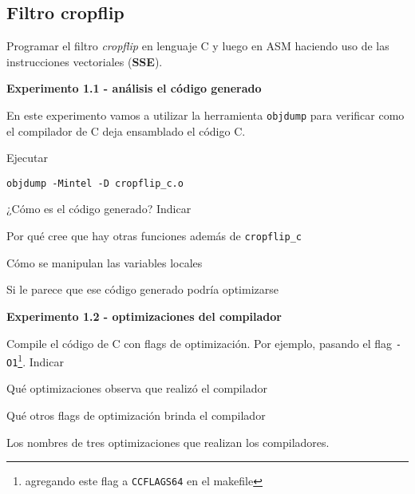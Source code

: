 \subsection{Filtro cropflip}

Programar el filtro \textit{cropflip} en lenguaje C y luego en ASM haciendo 
uso de las instrucciones vectoriales (\textbf{SSE}).

\vspace*{0.3cm} \noindent
\textbf{Experimento 1.1 - análisis el código generado}

En este experimento vamos a utilizar la herramienta \verb|objdump| para 
verificar como el compilador de C deja ensamblado el código C.

Ejecutar 
\begin{codesnippet}
\begin{verbatim}
objdump -Mintel -D cropflip_c.o
\end{verbatim}
\end{codesnippet}

¿Cómo es el código generado? 
Indicar
\begin{inparaenum}
    \item Por qué cree que hay otras funciones además de \verb|cropflip_c|
    \item Cómo se manipulan las variables locales
    \item Si le parece que ese código generado podría optimizarse
\end{inparaenum}

\vspace*{0.3cm} \noindent
\textbf{Experimento 1.2 - optimizaciones del compilador}

Compile el código de C con flags de optimización. Por ejemplo, pasando el flag 
\verb|-O1|\footnote{agregando este flag a \texttt{CCFLAGS64} en el makefile}. 
Indicar
\begin{inparaenum}
    \item Qué optimizaciones observa que realizó el compilador
    \item Qué otros flags de optimización brinda el compilador
    \item Los nombres de tres optimizaciones que realizan los compiladores.
\end{inparaenum}


